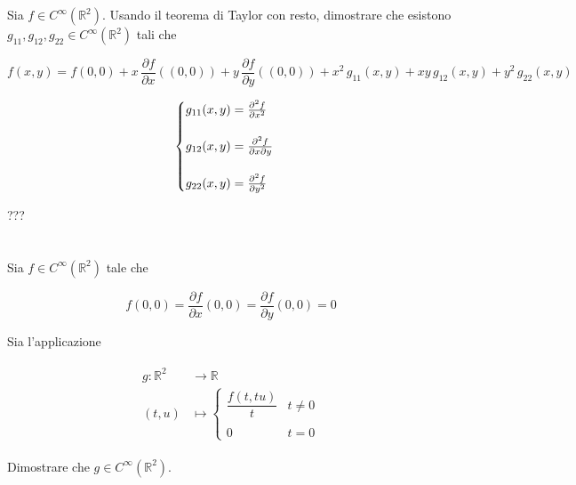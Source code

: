 \begin{tcolorbox}
	Sia $ f \in C^{\infty}(\mathbb{R}^{2}) $. Usando il teorema di Taylor con resto, dimostrare che esistono $ g_{11},g_{12},g_{22} \in C^{\infty}(\mathbb{R}^{2}) $ tali che
	
	\begin{equation}
		f(x,y) = f(0,0) + x \, \dfrac{\partial f}{\partial x} ((0,0)) + y \, \dfrac{\partial f}{\partial y} ((0,0)) + x^{2} \, g_{11}(x,y) + x y \, g_{12}(x,y) + y^{2} \, g_{22}(x,y)
	\end{equation}
\end{tcolorbox}

\begin{equation}
	\begin{cases}
		g_{11}(x,y) = \pdv[2]{f}{x} (0,0)\\\\
		g_{12}(x,y) = \pdv{f}{x}{y} (0,0)\\\\
		g_{22}(x,y) = \pdv[2]{f}{y} (0,0)
	\end{cases}
\end{equation}

???

\tocless\section{}\label{es1-6}

\begin{tcolorbox}
	Sia $ f \in C^{\infty}(\mathbb{R}^{2}) $ tale che
	
	\begin{equation}
		f(0,0) = \dfrac{\partial f}{\partial x} (0,0) = \dfrac{\partial f}{\partial y} (0,0) = 0
	\end{equation}

	Sia l'applicazione
	
	\begin{align}
		\begin{split}
			g : \mathbb{R}^{2} & \to \mathbb{R}\\
			(t,u) &\mapsto%
			\begin{cases}
				\dfrac{f(t,tu)}{t} & t \neq 0\\\\
				0 & t = 0
			\end{cases}
		\end{split}
	\end{align}
	
	Dimostrare che $ g \in C^{\infty}(\mathbb{R}^{2}) $.
\end{tcolorbox}

